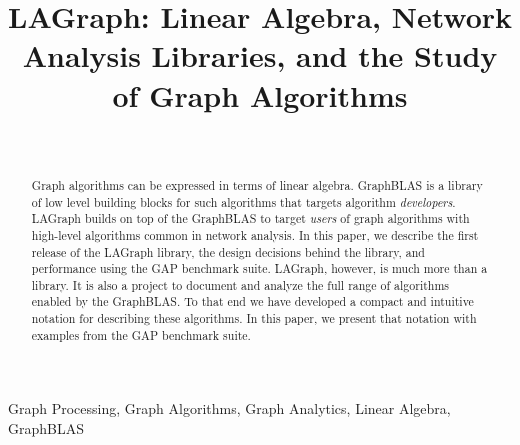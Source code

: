 \documentclass[conference]{IEEEtran}
\begin{document}
\title{LAGraph: Linear Algebra, Network Analysis Libraries, and the Study of Graph Algorithms}
\author{ %
 \\
}
\maketitle

\begin{abstract}

Graph algorithms can be expressed in terms of 
linear algebra. GraphBLAS is a library of low level building blocks for such algorithms
that targets algorithm \emph{developers}.  LAGraph builds on top of the GraphBLAS to
target \emph{users} of graph algorithms with high-level algorithms common in network
analysis.   In this paper, we describe 
the first release of the LAGraph library, the design decisions behind the
library, and performance using the GAP benchmark suite.
LAGraph, however, is much more than a library. It is also a
project to document and analyze the full range of algorithms enabled by the GraphBLAS.  To that end
we have developed a compact and intuitive notation for describing
these algorithms.  In this paper, we present that 
notation with examples from the GAP benchmark suite.  

\end{abstract}

\begin{IEEEkeywords}
Graph Processing, Graph Algorithms, Graph Analytics, Linear Algebra, GraphBLAS
\end{IEEEkeywords}



%

















\end{document}
